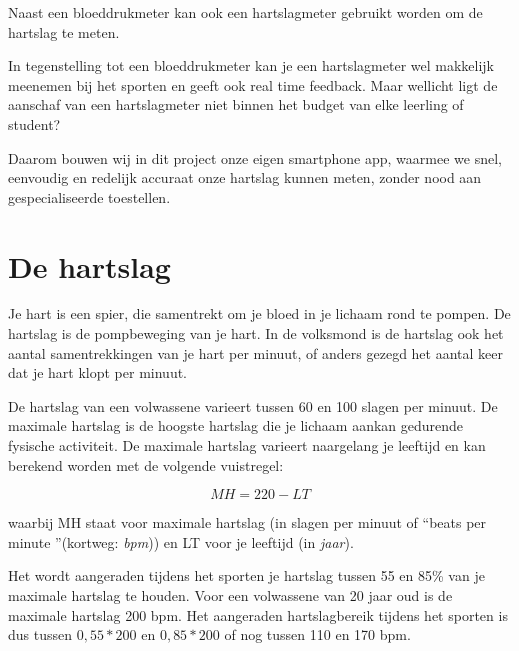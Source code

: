 Naast een bloeddrukmeter kan ook een hartslagmeter gebruikt worden om de hartslag te meten. 

\begin{minipage}{.5\linewidth}
\end{minipage} 
\begin{minipage}{.5\linewidth}
\end{minipage} 

In tegenstelling tot een bloeddrukmeter kan je een hartslagmeter wel makkelijk meenemen bij het sporten en geeft ook real time feedback. Maar wellicht ligt de aanschaf van een hartslagmeter niet binnen het budget van elke leerling of student?

Daarom bouwen wij in dit project onze eigen smartphone app, waarmee we snel, eenvoudig en redelijk accuraat onze hartslag kunnen meten, zonder nood aan gespecialiseerde toestellen.


\section{De hartslag}
\label{sec:Mod1_Sec2}

Je hart is een spier, die samentrekt om je bloed in je lichaam rond te pompen. De hartslag is de pompbeweging van je hart. In de volksmond is de hartslag ook het aantal samentrekkingen van je hart per minuut, of anders gezegd het aantal keer dat je hart klopt per minuut.

De hartslag van een volwassene varieert tussen 60 en 100 slagen per minuut. De maximale hartslag is de hoogste hartslag die je lichaam aankan gedurende fysische activiteit. De maximale hartslag varieert naargelang je leeftijd en kan berekend worden met de volgende vuistregel:

\begin{equation*}
MH = 220-LT
\end{equation*}

waarbij MH staat voor maximale hartslag (in slagen per minuut of \textquotedblleft beats per minute \textquotedblright (kortweg: \emph{bpm})) en LT voor je leeftijd (in \emph{jaar}).

Het wordt aangeraden tijdens het sporten je hartslag tussen 55 en 85\% van je maximale hartslag te houden. Voor een volwassene van 20 jaar oud is de maximale hartslag 200 bpm. Het aangeraden hartslagbereik tijdens het sporten is dus tussen $0,55*200$ en $0,85*200$ of nog tussen 110 en 170 bpm.

